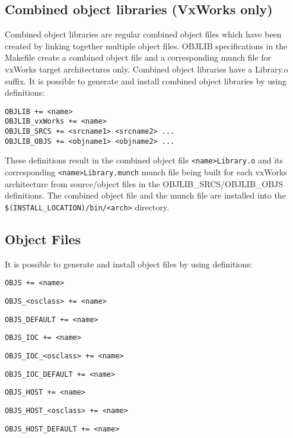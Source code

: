 \subsection{ Combined object libraries (VxWorks only)}

Combined object libraries are regular combined object files which have been created by linking together multiple object 
files. OBJLIB specifications in the Makefile create a combined object file and a corresponding munch file for vxWorks 
target architectures only. Combined object libraries have a Library.o suffix. It is possible to generate and install combined 
object libraries by using definitions:

\begin{verbatim}
OBJLIB += <name>
OBJLIB_vxWorks += <name>
OBJLIB_SRCS += <srcname1> <srcname2> ...
OBJLIB_OBJS += <objname1> <objname2> ...
\end{verbatim}

These definitions result in the combined object file \verb|<name>Library.o| and its corresponding \verb|<name>Library.munch| munch 
file being built for each vxWorks architecture from source/object files in the OBJLIB\_SRCS/OBJLIB\_OBJS definitions. 
The combined object file and the munch file are installed into the \verb|$(INSTALL_LOCATION)/bin/<arch>| directory. 

\subsection{Object Files}

It is possible to generate and install object files by using definitions:

\begin{description}
\item {}\verb|OBJS += <name>|

\item \verb|OBJS_<osclass> += <name>|

\item \verb|OBJS_DEFAULT += <name>|

\item {}\verb|OBJS_IOC += <name>|

\item \verb|OBJS_IOC_<osclass> += <name>|

\item \verb|OBJS_IOC_DEFAULT += <name>|

\item {}\verb|OBJS_HOST += <name>|

\item \verb|OBJS_HOST_<osclass> += <name>|

\item \verb|OBJS_HOST_DEFAULT += <name>|

\end{description}

